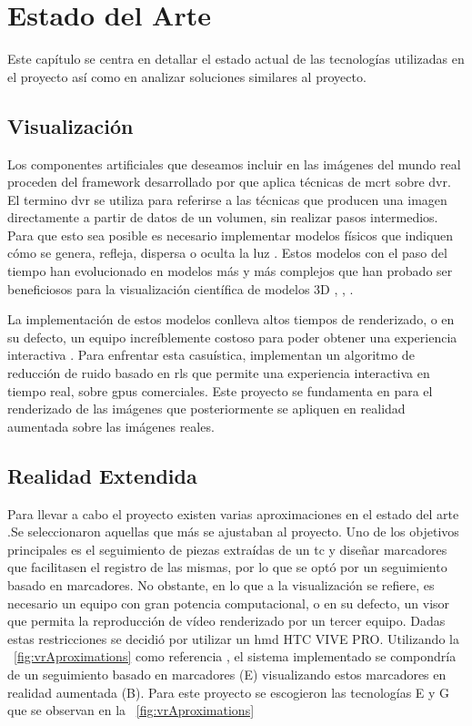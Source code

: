 \chapter{Estado del Arte}
\label{chap:ea}
Este capítulo se centra en detallar el estado actual de las tecnologías utilizadas en el proyecto así como en analizar soluciones similares al proyecto.
\section{Visualización}
Los componentes artificiales que deseamos incluir en las imágenes del mundo real proceden del framework desarrollado por \citeauthor{Kroes2012} que aplica técnicas de \acrfull{mcrt} sobre \acrfull{dvr}.
El termino \acrshort{dvr} se utiliza para referirse a las técnicas que producen una imagen directamente a partir de datos de un volumen, sin realizar pasos intermedios. Para que esto sea posible es necesario implementar modelos físicos que indiquen cómo se genera, refleja, dispersa o oculta la luz \cite{Max1995}. Estos modelos con el paso del tiempo han evolucionado en modelos más y más complejos que han probado ser beneficiosos para la visualización científica de modelos 3D \cite{Daz2015}, \cite{Englund2016}, \cite{Lindemann2011} .

La implementación de estos modelos conlleva altos tiempos de renderizado, o en su defecto, un equipo increíblemente costoso para poder obtener una experiencia interactiva \cite{IglesiasGuitian2022}. Para enfrentar esta casuística,  \citeauthor{IglesiasGuitian2022} implementan un algoritmo de reducción de ruido basado en \acrfull{rls} que permite una experiencia interactiva en tiempo real, sobre \acrshort{gpu}s comerciales. Este proyecto se fundamenta en \cite{IglesiasGuitian2022} para el renderizado de las imágenes que posteriormente se apliquen en realidad aumentada sobre las imágenes reales.

\section{Realidad Extendida}

Para llevar a cabo el proyecto existen varias aproximaciones en el estado del arte \cite{Venkatesan2021}.Se seleccionaron aquellas que más se ajustaban al proyecto.
Uno de los objetivos principales es el seguimiento de piezas extraídas de un \acrshort{tc} y diseñar marcadores que facilitasen el registro de las mismas, por lo que se optó por un seguimiento basado en marcadores. No obstante, en lo que a la visualización se refiere, es necesario un equipo con gran potencia computacional, o en su defecto, un visor que permita la reproducción de vídeo renderizado por un tercer equipo. Dadas estas restricciones se decidió por utilizar un \acrfull{hmd} HTC VIVE PRO. Utilizando la \figurename~\ref{fig:vrAproximations} \cite{Venkatesan2021} como referencia , el sistema implementado se compondría de un seguimiento basado en marcadores (E) visualizando estos marcadores en realidad aumentada (B).
Para este proyecto se escogieron las tecnologías E y G que se observan en  la \figurename~\ref{fig:vrAproximations}

